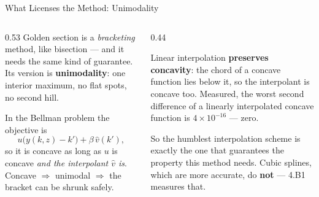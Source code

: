 \begin{frame}{What Licenses the Method: Unimodality}
\begin{columns}[T]
\begin{column}{0.53\textwidth}
\small
Golden section is a \emph{bracketing} method, like bisection --- and it needs the same kind of guarantee. Its version is \textbf{unimodality}: one interior maximum, no flat spots, no second hill.
\medskip

In the Bellman problem the objective is
\[
  u\big(y(k,z)-k'\big)+\beta\,\hat v(k'),
\]
so it is concave as long as $u$ is concave \emph{and the interpolant $\hat v$ is}. Concave $\Rightarrow$ unimodal $\Rightarrow$ the bracket can be shrunk safely.
\end{column}
\begin{column}{0.44\textwidth}
\begin{cautionbox}[title=\textbf{And it does}]\small
Linear interpolation \textbf{preserves concavity}: the chord of a concave function lies below it, so the interpolant is concave too. Measured, the worst second difference of a linearly interpolated concave function is $4\times10^{-16}$ --- zero.
\end{cautionbox}
\medskip
\begin{takeawaybox}\footnotesize
So the humblest interpolation scheme is exactly the one that guarantees the property this method needs. Cubic splines, which are more accurate, do \textbf{not} --- 4.B1 measures that.
\end{takeawaybox}
\end{column}
\end{columns}
\end{frame}

